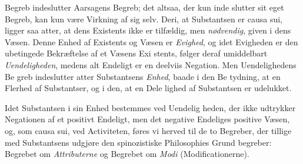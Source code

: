 \documentclass[12pt,a4paper]{book}
\begin{document}
Begreb indeslutter Aarsagens Begreb; det altsaa, der kun inde\-%
slutter sit eget Begreb, kan kun være Virkning af sig selv. Deri,
at Substantsen er causa sui, ligger saa atter, at dens Existents
ikke er tilfældig, men \emph{nødvendig}, given i dens Væsen.
Denne Enhed af Existents og Væsen er \emph{Evighed}, og idet
Evigheden er den ubetingede Bekræftelse af et Væsens Exi\-%
stents, følger deraf umiddelbart \emph{Uendeligheden}, medens
alt Endeligt er en deelviis Negation. Men Uendelighedens Be\-%
greb indeslutter atter Substantsens \emph{Enhed}, baade i den Be\-%
tydning, at en Flerhed af Substantser, og i den, at en Dele\-%
lighed af Substantsen er udelukket.

Idet Substantsen i sin Enhed bestemmes ved Uendelig\-%
heden, der ikke udtrykker Negationen af et positivt Endeligt,
men det negative Endeliges positive Væsen, og, som causa sui,
ved Activiteten, føres vi herved til de to Begreber, der tillige\-%
med Substantsens udgjøre den spinozistiske Philosophies Grund\-%
begreber: Begrebet om \emph{Attributerne} og Begrebet om \emph{Modi}
(Modificationerne).
\end{document}
